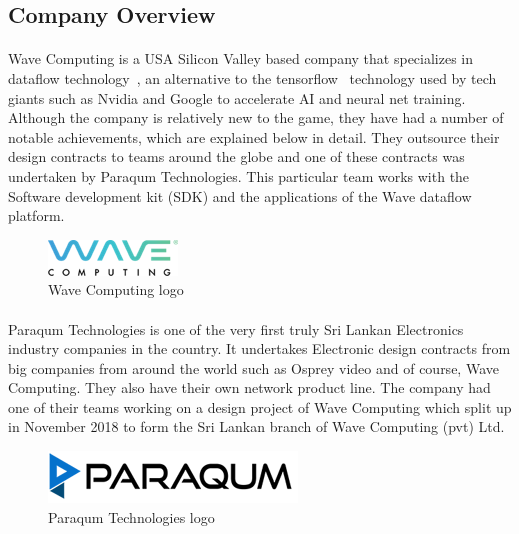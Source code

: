 
\subsection{Company Overview}

\paragraph{}
Wave Computing is a USA Silicon Valley based company that specializes in dataflow technology~\cite{waveintro}, an alternative to the tensorflow~\cite{tflow} technology used by tech giants such as {Nvidia} and {Google} to accelerate {AI} and neural net training. Although the company is relatively new to the game, they have had a number of notable achievements, which are explained below in detail. They outsource their design contracts to teams around the globe and one of these contracts was undertaken by Paraqum Technologies. This particular team works with the Software development kit ({SDK}) and the applications of the Wave dataflow platform.
\begin{figure}[h]
    \centering
    \includegraphics[trim=0cm 0cm 0cm 0cm, clip=true,scale=1]{figures/wave_logo.png}
    \caption{Wave Computing logo\label{Fig:Wave}}\vspace{-4mm}
    \end{figure}


\paragraph{}
Paraqum Technologies is one of the very first truly Sri Lankan Electronics industry companies in the country. It undertakes Electronic design contracts from big companies from around the world such as Osprey video and of course, Wave Computing. They also have their own network product line. The company had one of their teams working on a design project of Wave Computing which split up in November 2018 to form the Sri Lankan branch of Wave Computing (pvt) Ltd. 
\begin{figure}[h]
    \centering
    \includegraphics[trim=0cm 0cm 0cm 0cm, clip=true,scale=1]{figures/pqm_logo.png}
    \caption{Paraqum Technologies logo\label{Fig:Paraqum}}\vspace{-4mm}
    \end{figure}

